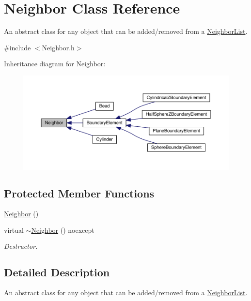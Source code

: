\hypertarget{classNeighbor}{\section{Neighbor Class Reference}
\label{classNeighbor}
}


An abstract class for any object that can be added/removed from a \hyperlink{classNeighborList}{Neighbor\+List}.  




{\ttfamily \#include $<$Neighbor.\+h$>$}



Inheritance diagram for Neighbor\+:\nopagebreak
\begin{figure}[H]
\begin{center}
\leavevmode
\includegraphics[width=350pt]{classNeighbor__inherit__graph}
\end{center}
\end{figure}
\subsection*{Protected Member Functions}
\begin{DoxyCompactItemize}
\item 
\hyperlink{classNeighbor_a179a8cd94aac70aeaf2bef17fa363ef5}{Neighbor} ()
\item 
virtual \hyperlink{classNeighbor_a6b5cbfb8ae7f168faac4081af62d74db}{$\sim$\+Neighbor} () noexcept
\begin{DoxyCompactList}\small\item\em Destructor. \end{DoxyCompactList}\end{DoxyCompactItemize}


\subsection{Detailed Description}
An abstract class for any object that can be added/removed from a \hyperlink{classNeighborList}{Neighbor\+List}. 

